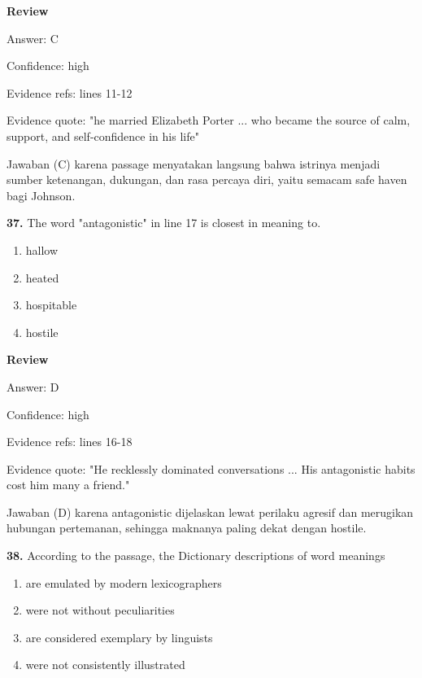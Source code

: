 \documentclass[12pt]{article}
\begin{document}
\par
\begingroup
\setlength{\parskip}{0pt}
\setlength{\parindent}{0pt}
\textbf{Review}\par
Answer: C\par
Confidence: high\par
Evidence refs: lines 11-12\par
Evidence quote: "he married Elizabeth Porter ... who became the source of calm, support, and self-confidence in his life"\par
Jawaban (C) karena passage menyatakan langsung bahwa istrinya menjadi sumber ketenangan, dukungan, dan rasa percaya diri, yaitu semacam safe haven bagi Johnson.\par
\endgroup
\par
\vspace{0.25\baselineskip}
\noindent\textbf{37.} The word "antagonistic" in line 17 is closest in meaning to.
\begin{enumerate}[label=(\Alph*),leftmargin=*,itemsep=0.2em]
\item hallow
\item heated
\item hospitable
\item hostile
\end{enumerate}
\par
\begingroup
\setlength{\parskip}{0pt}
\setlength{\parindent}{0pt}
\textbf{Review}\par
Answer: D\par
Confidence: high\par
Evidence refs: lines 16-18\par
Evidence quote: "He recklessly dominated conversations ... His antagonistic habits cost him many a friend."\par
Jawaban (D) karena antagonistic dijelaskan lewat perilaku agresif dan merugikan hubungan pertemanan, sehingga maknanya paling dekat dengan hostile.\par
\endgroup
\par
\vspace{0.25\baselineskip}
\noindent\textbf{38.} According to the passage, the Dictionary descriptions of word meanings
\begin{enumerate}[label=(\Alph*),leftmargin=*,itemsep=0.2em]
\item are emulated by modern lexicographers
\item were not without peculiarities
\item are considered exemplary by linguists
\item were not consistently illustrated
\end{enumerate}
\end{document}
